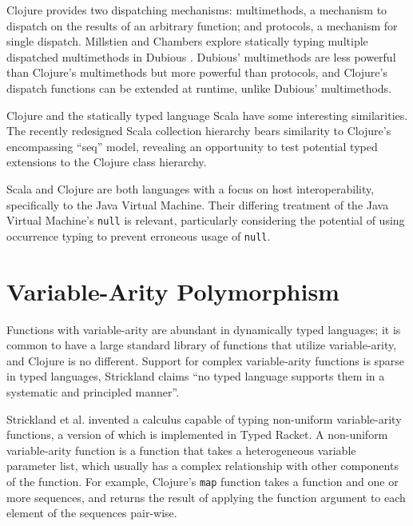 Clojure provides two dispatching mechanisms: multimethods, a mechanism to dispatch on the
results of an arbitrary function; and protocols, a mechanism for single dispatch.
Millstien and Chambers explore statically typing multiple dispatched multimethods in Dubious \cite{Millstein02modularstatically}.
Dubious' multimethods are less powerful than Clojure's multimethods but more powerful than protocols,
and Clojure's dispatch functions can be extended at runtime, unlike Dubious' multimethods.

Clojure and the statically typed language Scala \cite{Odersky06anoverview} 
have some interesting similarities. The recently redesigned 
Scala collection hierarchy
\cite{Odersky06anoverview} \cite{Scala:Collections}
bears similarity to Clojure's encompassing ``seq''
model, revealing an opportunity to test potential typed extensions to the Clojure 
class hierarchy. 

Scala and Clojure are both languages with a focus on host interoperability, specifically
to the Java Virtual Machine. Their differing treatment of the Java Virtual Machine's \lstinline|null| is
relevant, particularly considering the potential of using occurrence typing \cite{Tobin-Hochstadt:2010:LTU:1932681.1863561}
to prevent erroneous usage of \lstinline|null|.

\section{Variable-Arity Polymorphism}

Functions with variable-arity are abundant in dynamically typed languages;
it is common to have a large standard library of functions that utilize
variable-arity, and Clojure is no different. 
Support for complex variable-arity functions is sparse in typed languages,
Strickland claims \cite{Strickland:2009:PVP:1532974.1532978}
``no typed language supports them in a systematic and principled manner''.

Strickland et al. invented \cite{Strickland:2009:PVP:1532974.1532978} 
a calculus capable of typing non-uniform variable-arity functions, a version of which
is implemented in Typed Racket. A non-uniform variable-arity function is a function that
takes a heterogeneous variable parameter list, which usually has a complex relationship 
with other components of the function.
For example, Clojure's \lstinline|map| function takes a function and one or more sequences,
and returns the result of applying the function argument to each element of the sequences pair-wise.


